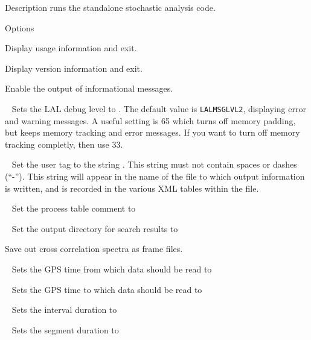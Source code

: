 \begin{entry}
\item[Description]
 runs the standalone stochastic analysis code.

\item[Options]\leavevmode
\begin{entry}
\item[\option{--help}]
Display usage information and exit.

\item[\option{--version}]
Display version information and exit.

\item[\option{--verbose}]
Enable the output of informational messages.

\item[\option{--debug-level}~\parm{N}]
Sets the LAL debug level to . The default value is
\texttt{LALMSGLVL2}, displaying error and warning messages. A useful
setting is 65 which turns off memory padding, but keeps memory tracking
and error messages. If you want to turn off memory tracking completly,
then use 33.

\item[\option{--user-tag}~\parm{STRING}]
Set the user tag to the string . This string must not
contain spaces or dashes (``-''). This string will appear in the name of
the file to which output information is written, and is recorded in the
various XML tables within the file.

\item[\option{--comment}~\parm{STRING}]
Set the process table comment to 

\item[\option{--output-dir}~\parm{DIR}]
Set the output directory for search results to 

\item[\option{--cc-spectra}]
Save out cross correlation spectra as frame files.

\item[\option{--gps-start-time}~\parm{N}]
Sets the GPS time from which data should be read to 

\item[\option{--gps-end-time}~\parm{N}]
Sets the GPS time to which data should be read to 

\item[\option{--interval-duration}~\parm{N}]
Sets the interval duration to 

\item[\option{--segment-duration}~\parm{N}]
Sets the segment duration to 


\end{entry}
\end{entry}
